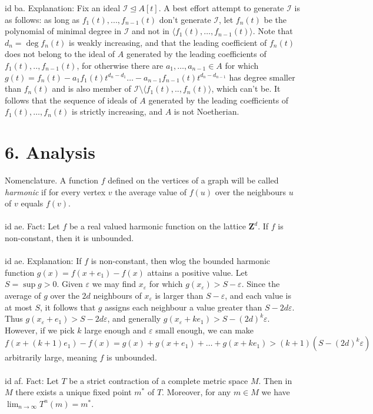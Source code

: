 \documentclass[oneside]{book}
\newcommand{\eps}{\varepsilon}
\newcommand{\Z}{\mathbf{Z}}
\newcommand{\II}{\mathscr{I}}
\newcommand{\ideal}{\trianglelefteq}
\newcommand{\gen}[1]{\langle #1\rangle}
\newcommand\chap[1]{%
  \chapter*{#1}%
  \addcontentsline{toc}{chapter}{#1}}
\begin{document}
    id ba. Explanation: Fix an ideal $\II\ideal A[t]$. A best effort attempt to generate $\II$ is as follows: as long as $f_1(t),...,f_{n-1}(t)$ don't generate $\II$, let $f_n(t)$ be the polynomial of minimal degree in $\II$ and not in $\gen{f_1(t),\dots,f_{n-1}(t)}$. Note that $d_n=\deg f_n(t)$ is weakly increasing, and that the leading coefficient of $f_n(t)$ does not belong to the ideal of $A$ generated by the leading coefficients of  $f_1(t),..,f_{n-1}(t)$, for otherwise there are $a_1,\dots,a_{n-1}\in A$ for which $g(t)=f_n(t)-a_1f_1(t)t^{d_n-d_1}\dots-a_{n-1}f_{n-1}(t)t^{d_n-d_{n-1}}$ has degree smaller than $f_n(t)$ and is also member of $\II\setminus \gen{f_1(t),..,f_n(t)}$, which can't be. It follows that the sequence of ideals of $A$ generated by the leading coefficients of $f_1(t),\dots,f_n(t)$ is strictly increasing, and $A$ is not Noetherian.

\newpage
\chap{6. Analysis}
Nomenclature. A function $f$ defined on the vertices of a graph will be called {\it{harmonic}} if for every vertex $v$ the average value of $f(u)$ over the neighbours $u$ of $v$ equals $f(v)$.  \\\\


id ae. Fact: Let $f$ be a real valued harmonic function on the lattice $\Z^d$. If $f$ is non-constant, then it is unbounded. \\\\


id ae. Explanation: If $f$ is non-constant, then wlog the bounded harmonic function $g(x)=f(x+e_1)-f(x)$ attains a positive value. Let $S=\sup g > 0$. Given $\eps$ we may find $x_\eps$ for which $g(x_\eps)>S-\eps$. Since the average of $g$ over the $2d$ neighbours of $x_\eps$ is larger than $S-\eps$, and each value is at most $S$, it follows that $g$ assigns each neighbour a value greater than $S-2d\eps$. Thus $g(x_\eps + e_1) > S-2d\eps$, and generally $g(x_\eps + ke_1) > S-(2d)^k\eps$. However, if we pick $k$ large enough and $\eps$ small enough, we can make $f(x+(k+1)e_1)-f(x)=g(x)+g(x+e_1)+\dots+g(x+ke_1) > (k+1)(S-(2d)^k\eps)$ arbitrarily large, meaning $f$ is unbounded.    \\\\


id af. Fact: Let $T$ be a strict contraction of a complete metric space $M$. Then in $M$ there exists a unique fixed point $m^*$ of $T$. Moreover, for any $m\in M$ we have $\displaystyle\lim_{n\to\infty} T^{ n}(m)=m^*$. \\\\
\end{document}
